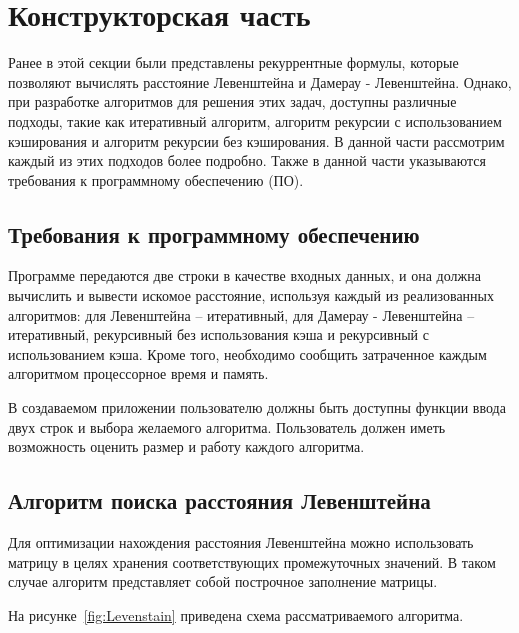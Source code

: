 \chapter{Конструкторская часть}

Ранее в этой секции были представлены рекуррентные формулы, которые позволяют вычислять расстояние Левенштейна и Дамерау - Левенштейна. 
Однако, при разработке алгоритмов для решения этих задач, доступны различные подходы, такие как итеративный алгоритм, алгоритм рекурсии с использованием кэширования и алгоритм рекурсии без кэширования. 
В данной части рассмотрим каждый из этих подходов более подробно. 
Также в данной части указываются требования к программному обеспечению (ПО).

\section{Требования к программному обеспечению}

Программе передаются две строки в качестве входных данных, и она должна вычислить и вывести искомое расстояние, используя каждый из реализованных алгоритмов: для Левенштейна -- итеративный, для Дамерау - Левенштейна -- итеративный, рекурсивный без использования кэша и рекурсивный с использованием кэша. 
Кроме того, необходимо сообщить затраченное каждым алгоритмом процессорное время и память.

В создаваемом приложении пользователю должны быть доступны функции ввода двух строк и выбора желаемого алгоритма. Пользователь должен иметь возможность оценить размер и работу каждого алгоритма.

\section{Алгоритм поиска расстояния Левенштейна}

Для оптимизации нахождения расстояния Левенштейна можно использовать матрицу в целях хранения соответствующих промежуточных значений. 
В таком случае алгоритм представляет собой построчное заполнение матрицы. 

На рисунке~\ref{fig:Levenstain} приведена схема рассматриваемого алгоритма.

